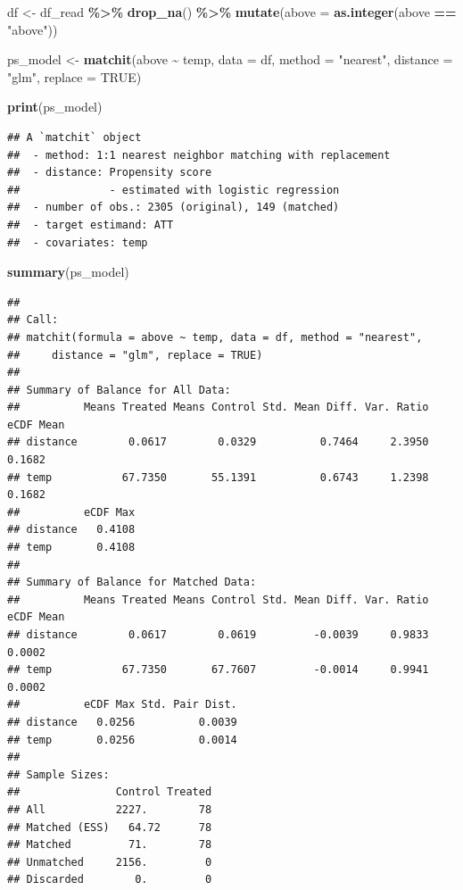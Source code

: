 \documentclass[
]{article}
\newenvironment{Shaded}{\begin{snugshade}}{\end{snugshade}}
\newcommand{\AttributeTok}[1]{\textcolor[rgb]{0.13,0.29,0.53}{#1}}
\newcommand{\ConstantTok}[1]{\textcolor[rgb]{0.56,0.35,0.01}{#1}}
\newcommand{\FunctionTok}[1]{\textcolor[rgb]{0.13,0.29,0.53}{\textbf{#1}}}
\newcommand{\NormalTok}[1]{#1}
\newcommand{\OtherTok}[1]{\textcolor[rgb]{0.56,0.35,0.01}{#1}}
\newcommand{\SpecialCharTok}[1]{\textcolor[rgb]{0.81,0.36,0.00}{\textbf{#1}}}
\newcommand{\StringTok}[1]{\textcolor[rgb]{0.31,0.60,0.02}{#1}}
\begin{document}
\begin{Shaded}
\begin{Highlighting}[]
\NormalTok{df }\OtherTok{\textless{}{-}}\NormalTok{ df\_read }\SpecialCharTok{\%\textgreater{}\%} \FunctionTok{drop\_na}\NormalTok{() }\SpecialCharTok{\%\textgreater{}\%} \FunctionTok{mutate}\NormalTok{(}\AttributeTok{above =} \FunctionTok{as.integer}\NormalTok{(above }\SpecialCharTok{==} \StringTok{"above"}\NormalTok{))}

\NormalTok{ps\_model }\OtherTok{\textless{}{-}} \FunctionTok{matchit}\NormalTok{(above }\SpecialCharTok{\textasciitilde{}}\NormalTok{ temp,}
                    \AttributeTok{data =}\NormalTok{ df,}
                    \AttributeTok{method =} \StringTok{"nearest"}\NormalTok{,}
                    \AttributeTok{distance =} \StringTok{"glm"}\NormalTok{,}
                    \AttributeTok{replace =} \ConstantTok{TRUE}\NormalTok{)}

\FunctionTok{print}\NormalTok{(ps\_model)}
\end{Highlighting}
\end{Shaded}

\begin{verbatim}
## A `matchit` object
##  - method: 1:1 nearest neighbor matching with replacement
##  - distance: Propensity score
##              - estimated with logistic regression
##  - number of obs.: 2305 (original), 149 (matched)
##  - target estimand: ATT
##  - covariates: temp
\end{verbatim}

\begin{Shaded}
\begin{Highlighting}[]
\FunctionTok{summary}\NormalTok{(ps\_model)}
\end{Highlighting}
\end{Shaded}

\begin{verbatim}
## 
## Call:
## matchit(formula = above ~ temp, data = df, method = "nearest", 
##     distance = "glm", replace = TRUE)
## 
## Summary of Balance for All Data:
##          Means Treated Means Control Std. Mean Diff. Var. Ratio eCDF Mean
## distance        0.0617        0.0329          0.7464     2.3950    0.1682
## temp           67.7350       55.1391          0.6743     1.2398    0.1682
##          eCDF Max
## distance   0.4108
## temp       0.4108
## 
## Summary of Balance for Matched Data:
##          Means Treated Means Control Std. Mean Diff. Var. Ratio eCDF Mean
## distance        0.0617        0.0619         -0.0039     0.9833    0.0002
## temp           67.7350       67.7607         -0.0014     0.9941    0.0002
##          eCDF Max Std. Pair Dist.
## distance   0.0256          0.0039
## temp       0.0256          0.0014
## 
## Sample Sizes:
##               Control Treated
## All           2227.        78
## Matched (ESS)   64.72      78
## Matched         71.        78
## Unmatched     2156.         0
## Discarded        0.         0
\end{verbatim}
\end{document}
